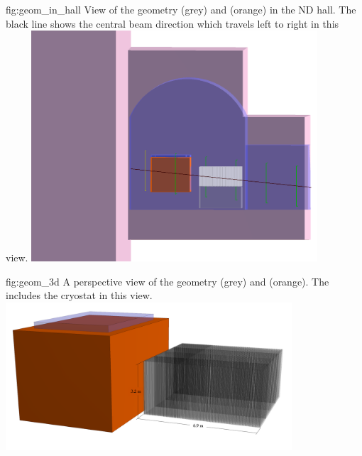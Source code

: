 \begin{dunefigure}{fig:geom_in_hall}
{View of the  geometry (grey) and  (orange) in the ND hall. The black line shows the central beam direction which travels left to right in this view. }
\includegraphics[width=0.8\textwidth]{graphics/tms/Geometry/TMS_LAr.png}
\end{dunefigure}
\begin{dunefigure}{fig:geom_3d}
{A perspective view of the  geometry (grey) and  (orange). The  includes the cryostat in this view.}
\includegraphics[width=0.8\textwidth]{graphics/tms/Geometry/TMS_LAr_No_Hall.png}
\end{dunefigure}

